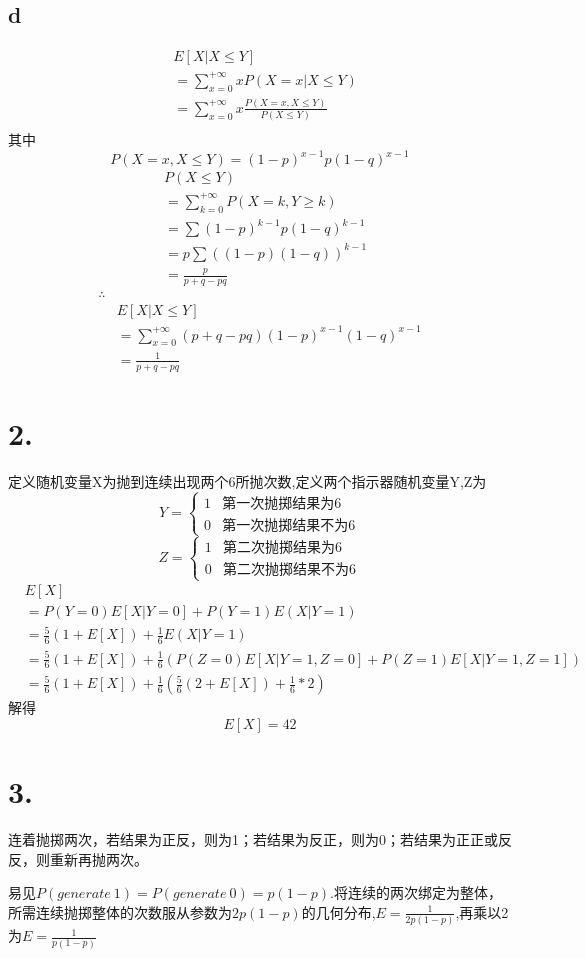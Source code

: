 \documentclass[a4paper,twocolumn]{ctexart}
\begin{document}
\subsection*{d}
\begin{align*}
&E[X|X\le Y]\\
&=\sum_{x=0}^{+\infty}xP(X=x|X\le Y)\\
&=\sum_{x=0}^{+\infty}x\frac{P(X=x,X\le Y)}{P(X\le Y)}\\
\end{align*}
其中
\[P(X=x,X\le Y)=(1-p)^{x-1}p(1-q)^{x-1}\]
\begin{align*}
&P(X\le Y)\\
&=\sum_{k=0}^{+\infty}P(X=k,Y\ge k)\\
&=\sum (1-p)^{k-1}p(1-q)^{k-1}\\
&=p\sum \left((1-p)(1-q)\right)^{k-1}\\
&=\frac{p}{p+q-pq}
\end{align*}
\begin{align*}
\therefore\\
&E[X|X\le Y]\\
&=\sum_{x=0}^{+\infty}(p+q-pq)(1-p)^{x-1}(1-q)^{x-1}\\
&=\frac{1}{p+q-pq}
\end{align*}

\section*{2.}
定义随机变量X为抛到连续出现两个6所抛次数,定义两个指示器随机变量Y,Z为
\[
Y=
\begin{cases}
1&\text{第一次抛掷结果为6}\\
0&\text{第一次抛掷结果不为6}
\end{cases}
\]
\[
Z=
\begin{cases}
1&\text{第二次抛掷结果为6}\\
0&\text{第二次抛掷结果不为6}
\end{cases}
\]
\begin{align*}
&E[X]\\
&=P(Y=0)E[X|Y=0]+P(Y=1)E(X|Y=1)\\
&=\frac{5}{6}(1+E[X])+\frac{1}{6}E(X|Y=1)\\
&=\frac{5}{6}(1+E[X])+\frac{1}{6}\left(P(Z=0)E[X|Y=1,Z=0]+P(Z=1)E[X|Y=1,Z=1]\right)\\
&=\frac{5}{6}(1+E[X])+\frac{1}{6}\left(\frac{5}{6}(2+E[X])+\frac{1}{6}*2\right)
\end{align*}
解得
\[
E[X]=42
\]

\section*{3.}
连着抛掷两次，若结果为正反，则为1；若结果为反正，则为0；若结果为正正或反反，则重新再抛两次。

易见$P(generate\ 1)=P(generate\ 0)=p(1-p)$.将连续的两次绑定为整体，所需连续抛掷整体的次数服从参数为$2p(1-p)$的几何分布,$E=\frac{1}{2p(1-p)}$,再乘以2为$E=\frac{1}{p(1-p)}$
\end{document}
